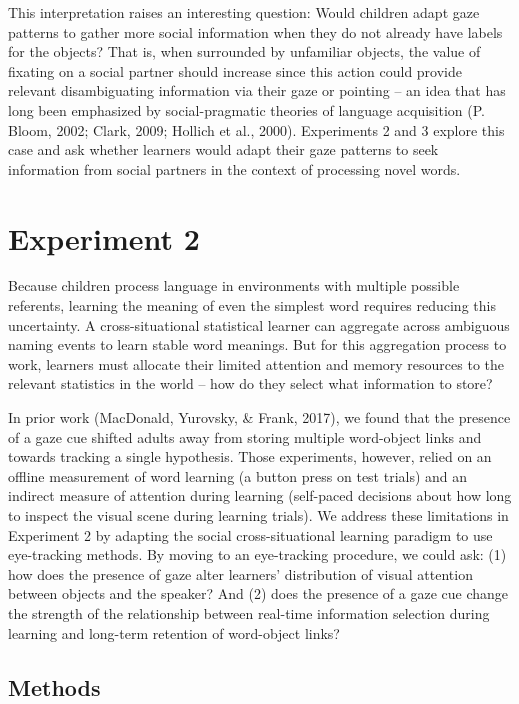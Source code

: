 \documentclass[man,floatsintext]{apa6}
\begin{document}
This interpretation raises an interesting question: Would children adapt
gaze patterns to gather more social information when they do not already
have labels for the objects? That is, when surrounded by unfamiliar
objects, the value of fixating on a social partner should increase since
this action could provide relevant disambiguating information via their
gaze or pointing -- an idea that has long been emphasized by
social-pragmatic theories of language acquisition (P. Bloom, 2002;
Clark, 2009; Hollich et al., 2000). Experiments 2 and 3 explore this
case and ask whether learners would adapt their gaze patterns to seek
information from social partners in the context of processing novel
words.

\section{Experiment 2}\label{experiment-2}

Because children process language in environments with multiple possible
referents, learning the meaning of even the simplest word requires
reducing this uncertainty. A cross-situational statistical learner can
aggregate across ambiguous naming events to learn stable word meanings.
But for this aggregation process to work, learners must allocate their
limited attention and memory resources to the relevant statistics in the
world -- how do they select what information to store?

In prior work (MacDonald, Yurovsky, \& Frank, 2017), we found that the
presence of a gaze cue shifted adults away from storing multiple
word-object links and towards tracking a single hypothesis. Those
experiments, however, relied on an offline measurement of word learning
(a button press on test trials) and an indirect measure of attention
during learning (self-paced decisions about how long to inspect the
visual scene during learning trials). We address these limitations in
Experiment 2 by adapting the social cross-situational learning paradigm
to use eye-tracking methods. By moving to an eye-tracking procedure, we
could ask: (1) how does the presence of gaze alter learners'
distribution of visual attention between objects and the speaker? And
(2) does the presence of a gaze cue change the strength of the
relationship between real-time information selection during learning and
long-term retention of word-object links?

\subsection{Methods}\label{methods-1}
\end{document}
